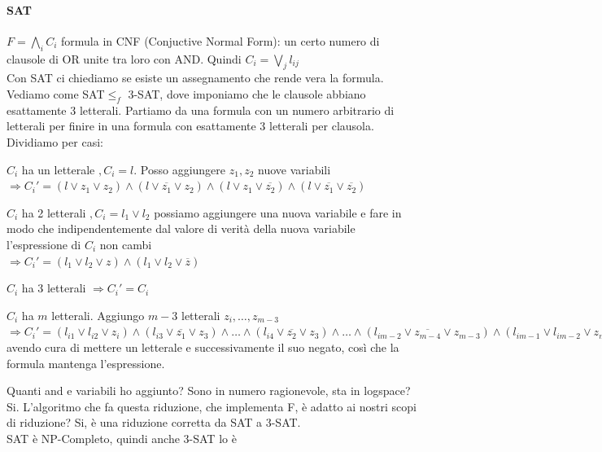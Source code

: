 \documentclass[10pt]{book}
\begin{document}
\paragraph{SAT} $F = \bigwedge_i C_i$ formula in CNF (Conjuctive Normal Form): un certo numero di clausole di OR unite tra loro con AND. Quindi $C_i = \bigvee_j l_{ij}$\\
Con SAT ci chiediamo se esiste un assegnamento che rende vera la formula. Vediamo come SAT$\leq_f$ 3-SAT, dove imponiamo che le clausole abbiano esattamente 3 letterali. Partiamo da una formula con un numero arbitrario di letterali per finire in una formula con esattamente 3 letterali per clausola. Dividiamo per casi:
\begin{list}{}{}
	\item $C_i$ ha un letterale $, C_i = l$. Posso aggiungere $z_1, z_2$ nuove variabili\\
	$\Rightarrow C_i' = (l\vee z_1 \vee z_2)\wedge(l\vee \overline{z_1} \vee z_2) \wedge (l\vee z_1 \vee \overline{z_2}) \wedge (l\vee \overline{z_1} \vee \overline{z_2})$
	\item $C_i$ ha 2 letterali $, C_i = l_1 \vee l_2$ possiamo aggiungere una nuova variabile e fare in modo che indipendentemente dal valore di verità della nuova variabile l'espressione di $C_i$ non cambi\\
	$\Rightarrow C_i' = (l_1 \vee l_2 \vee z) \wedge (l_1 \vee l_2 \vee \overline{z})$
	\item $C_i$ ha 3 letterali $\Rightarrow C_i' = C_i$
	\item $C_i$ ha $m$ letterali. Aggiungo $m - 3$ letterali $z_i, \ldots, z_{m-3}$\\
	$\Rightarrow C_i' = (l_{i1} \vee l_{i2} \vee z_i) \wedge (l_{i3} \vee \overline{z_1} \vee z_3) \wedge \ldots \wedge (l_{i4} \vee \overline{z_2} \vee z_3) \wedge \ldots \wedge (l_{i m-2} \vee \overline{z_{m-4}} \vee z_{m-3}) \wedge (l_{i m-1} \vee l_{i m-2} \vee \overline{z_{m-3}})$ avendo cura di mettere un letterale e successivamente il suo negato, così che la formula mantenga l'espressione.
\end{list}
	Quanti and e variabili ho aggiunto? Sono in numero ragionevole, sta in logspace? Si. L'algoritmo che fa questa riduzione, che implementa F, è adatto ai nostri scopi di riduzione? Si, è una riduzione corretta da SAT a 3-SAT.\\
	SAT è NP-Completo, quindi anche 3-SAT lo è
\end{document}
